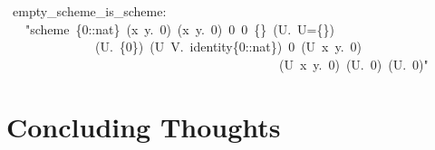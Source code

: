 \documentclass[12pt]{scrartcl}
\begin{document}
\begin{isabelle}
\ empty\_scheme\_is\_scheme:\isanewline
\ \ \ "scheme\ \{0::nat\}\ (\isasymlambda x\ y.\ 0)\ (\isasymlambda x\ y.\ 0)\ 0\ 0\ \{\}\ (\isasymlambda U.\ U=\{\})\ \isanewline
\ \ \ \ \ \ \ \ \ \ \ \ \ \ (\isasymlambda U.\ \{0\})\ (\isasymlambda U\ V.\ identity\{0::nat\})\ 0\ (\isasymlambda U\ x\ y.\ 0)\ \isanewline
\ \ \ \ \ \ \ \ \ \ \ \ \ \ \ \ \ \ \ \ \ \ \ \ \ \ \ \ \ \ \ \ \ \ \ \ \ \ \ \ \ \ \ (\isasymlambda U\ x\ y.\ 0)\ (\isasymlambda U.\ 0)\ (\isasymlambda U.\ 0)"
\end{isabelle}

\section{Concluding Thoughts}
\setlength\parindent {5ex}
\end{document}
